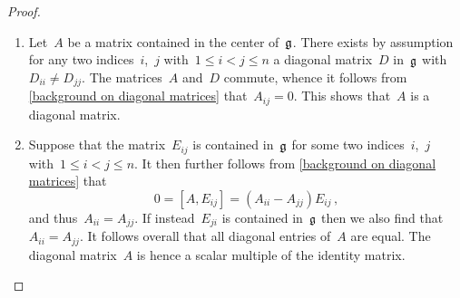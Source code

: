 \begin{proof}
	\leavevmode
	\begin{enumerate}
		\item
			Let~$A$ be a matrix contained in the center of~$\mathfrak{g}$.
			There exists by assumption for any two indices~$i$,~$j$ with~$1 \leq i < j \leq n$ a diagonal matrix~$D$ in~$\mathfrak{g}$ with~$D_{ii} \neq D_{jj}$.
			The matrices~$A$ and~$D$ commute, whence it follows from \cref{background on diagonal matrices} that~$A_{ij} = 0$.
			This shows that~$A$ is a diagonal matrix.
		\item
			Suppose that the matrix~$E_{ij}$ is contained in~$\mathfrak{g}$ for some two indices~$i$,~$j$ with~$1 \leq i < j \leq n$.
			It then further follows from \cref{background on diagonal matrices} that
			\[
				0
				=
				[A, E_{ij}]
				=
				(A_{ii} - A_{jj}) E_{ij} \,,
			\]
			and thus~$A_{ii} = A_{jj}$.
			If instead~$E_{ji}$ is contained in~$\mathfrak{g}$ then we also find that~$A_{ii} = A_{jj}$.
			It follows overall that all diagonal entries of~$A$ are equal.
			The diagonal matrix~$A$ is hence a scalar multiple of the identity matrix.
		\qedhere
	\end{enumerate}
\end{proof}


